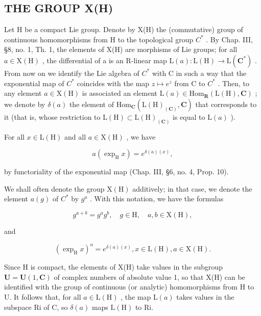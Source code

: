 \subsection{THE GROUP X(H)}

Let H be a compact Lie group. Denote by X(H) the (commutative) group of continuous homomorphisms from H to the topological group \(C^{*}\) . By Chap. III, §8, no. 1, Th. 1, the elements of X(H) are morphisms of Lie groups; for all \(a \in \mathrm{X}(\mathrm{H})\) , the differential of a is an R-linear map \(\mathrm{L}(a) : \mathrm{L}(\mathrm{H}) \to \mathrm{L}(\mathbf{C}^{*})\) . From now on we identify the Lie algebra of \(C^{*}\) with C in such a way that the exponential map of \(C^{*}\) coincides with the map \(z \mapsto e^{z}\) from C to \(C^{*}\) . Then, to any element \(a \in \mathrm{X}(\mathrm{H})\) is associated an element \(\mathrm{L}(a) \in \mathrm{Hom}_{\mathbf{R}}(\mathrm{L}(\mathrm{H}), \mathbf{C})\) ; we denote by \(\delta(a)\) the element of \(\mathrm{Hom}_{\mathbf{C}}(\mathrm{L}(\mathrm{H})_{(\mathbf{C})}, \mathbf{C})\) that corresponds to it (that is, whose restriction to \(\mathrm{L}(\mathrm{H}) \subset \mathrm{L}(\mathrm{H})_{(\mathbf{C})}\) is equal to \(\mathrm{L}(a)\) ).

For all \(x \in \mathrm{L}(\mathrm{H})\) and all \(a \in \mathrm{X}(\mathrm{H})\) , we have

\[
a (\exp_ {\mathrm{H}} x) = e ^ {\delta (a) (x)},
\]

by functoriality of the exponential map (Chap. III, §6, no. 4, Prop. 10).

We shall often denote the group \(\mathrm{X}(\mathrm{H})\) additively; in that case, we denote the element \(a(g)\) of \(C^{*}\) by \(g^{a}\) . With this notation, we have the formulas

\[
g ^ {a + b} = g ^ {a} g ^ {b}, \quad g \in \mathrm{H}, \quad a, b \in \mathrm{X(H)},
\]

and

\[
(\exp_ {\mathrm{H}} x) ^ {a} = e ^ {\delta (a) (x)}, x \in \mathrm{L} (\mathrm{H}), a \in \mathrm{X} (\mathrm{H}).
\]

Since H is compact, the elements of X(H) take values in the subgroup \(\mathbf{U} = \mathbf{U}(1, \mathbf{C})\) of complex numbers of absolute value 1, so that X(H) can be identified with the group of continuous (or analytic) homomorphisms from H to U. It follows that, for all \(a \in \mathrm{L}(\mathrm{H})\) , the map \(\mathrm{L}(a)\) takes values in the subspace Ri of C, so \(\delta(a)\) maps \(\mathrm{L}(\mathrm{H})\) to Ri.

